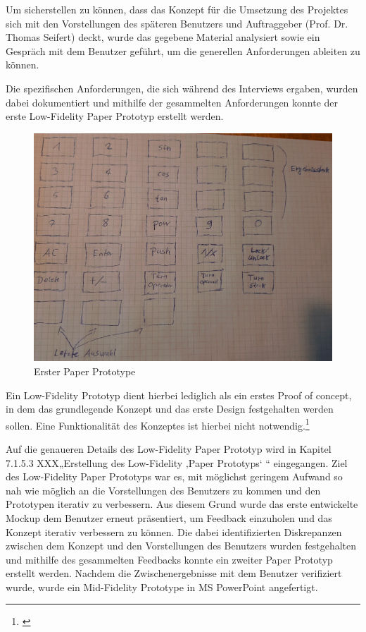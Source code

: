 Um sicherstellen zu können, dass das Konzept für die Umsetzung des Projektes sich mit den Vorstellungen des späteren Benutzers und Auftraggeber (Prof. Dr. Thomas Seifert) deckt, wurde das gegebene Material analysiert sowie ein Gespräch mit dem Benutzer geführt, um die generellen Anforderungen ableiten zu können. 

Die spezifischen Anforderungen, die sich während des Interviews ergaben, wurden dabei dokumentiert und mithilfe der gesammelten Anforderungen konnte der erste Low-Fidelity Paper Prototyp erstellt werden.


\begin{figure}[!h]
	\includegraphics[width=1\columnwidth]{img/planung-mockup-erster-mockup}
	\caption[Erster Paper Prototype]{Erster Paper Prototype\footnotemark}
\end{figure}


Ein Low-Fidelity Prototyp dient hierbei lediglich als ein erstes Proof of concept, in dem das grundlegende Konzept und das erste Design festgehalten werden sollen. Eine Funktionalität des Konzeptes ist hierbei nicht notwendig.\footnote{\cite[vgl.][S.~204]{jhammondtgrossjwesson2002}}

Auf die genaueren Details des Low-Fidelity Paper Prototyp wird in Kapitel 7.1.5.3 XXX„Erstellung des Low-Fidelity ‚Paper Prototyps‘ “ eingegangen. Ziel des Low-Fidelity Paper Prototyps war es, mit möglichst geringem Aufwand so nah wie möglich an die Vorstellungen des Benutzers zu kommen und den Prototypen iterativ zu verbessern. Aus diesem Grund wurde das erste entwickelte Mockup dem Benutzer erneut präsentiert, um Feedback einzuholen und das Konzept iterativ verbessern zu können. Die dabei identifizierten Diskrepanzen zwischen dem Konzept und den Vorstellungen des Benutzers wurden festgehalten und mithilfe des gesammelten Feedbacks konnte ein zweiter Paper Prototyp erstellt werden. Nachdem die Zwischenergebnisse mit dem Benutzer verifiziert wurde, wurde ein Mid-Fidelity Prototype in MS PowerPoint angefertigt.

